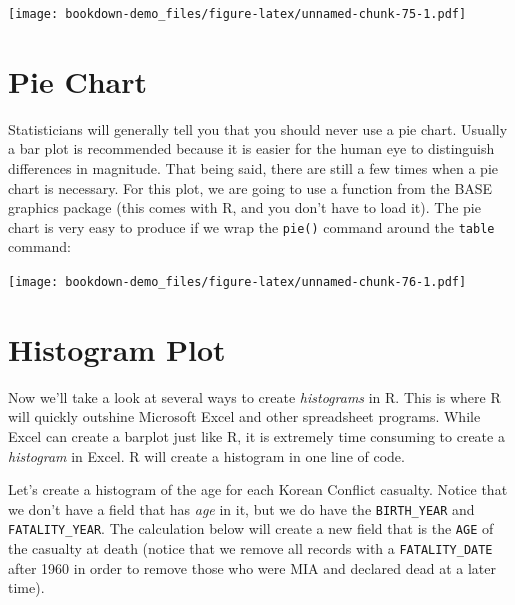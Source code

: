 \documentclass[]{book}
\newenvironment{Shaded}{\begin{snugshade}}{\end{snugshade}}
\newcommand{\KeywordTok}[1]{\textcolor[rgb]{0.13,0.29,0.53}{\textbf{{#1}}}}
\newcommand{\DataTypeTok}[1]{\textcolor[rgb]{0.13,0.29,0.53}{{#1}}}
\newcommand{\StringTok}[1]{\textcolor[rgb]{0.31,0.60,0.02}{{#1}}}
\newcommand{\NormalTok}[1]{{#1}}
\begin{document}
\texttt{[image: bookdown-demo\_files/figure-latex/unnamed-chunk-75-1.pdf]}

\section{Pie Chart}\label{pie-chart}

Statisticians will generally tell you that you should never use a pie
chart. Usually a bar plot is recommended because it is easier for the
human eye to distinguish differences in magnitude. That being said,
there are still a few times when a pie chart is necessary. For this
plot, we are going to use a function from the BASE graphics package
(this comes with R, and you don't have to load it). The pie chart is
very easy to produce if we wrap the \texttt{pie()} command around the
\texttt{table} command:

\begin{Shaded}
\end{Shaded}

\texttt{[image: bookdown-demo\_files/figure-latex/unnamed-chunk-76-1.pdf]}

\section{Histogram Plot}\label{histogram-plot}

Now we'll take a look at several ways to create \emph{histograms} in R.
This is where R will quickly outshine Microsoft Excel and other
spreadsheet programs. While Excel can create a barplot just like R, it
is extremely time consuming to create a \emph{histogram} in Excel. R
will create a histogram in one line of code.

Let's create a histogram of the age for each Korean Conflict casualty.
Notice that we don't have a field that has \emph{age} in it, but we do
have the \texttt{BIRTH\_YEAR} and \texttt{FATALITY\_YEAR}. The
calculation below will create a new field that is the \texttt{AGE} of
the casualty at death (notice that we remove all records with a
\texttt{FATALITY\_DATE} after 1960 in order to remove those who were MIA
and declared dead at a later time).
\end{document}
